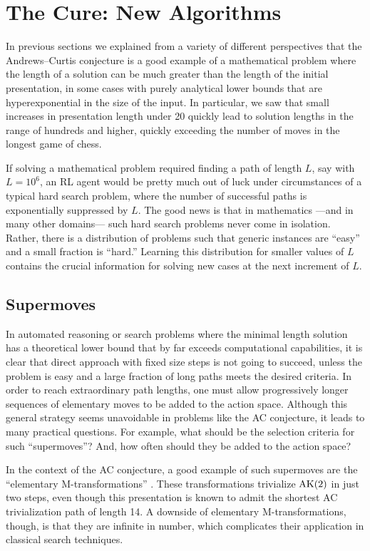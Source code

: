 \section{The Cure: New Algorithms}\label{sec:algo}

In previous sections we explained from a variety of different perspectives that the Andrews--Curtis conjecture is a good example of a mathematical problem where the length of a solution can be much greater than the length of the initial presentation, in some cases with purely analytical lower bounds that are hyperexponential in the size of the input. In particular, we saw that small increases in presentation length under 20 quickly lead to solution lengths in the range of hundreds and higher, quickly exceeding the number of moves in the longest game of chess.

If solving a mathematical problem required finding a path of length $L$, say with $L=10^6$, an RL agent would be pretty much out of luck under circumstances of a typical hard search problem, where the number of successful paths is exponentially suppressed by $L$. The good news is that in mathematics ---and in many other domains--- such hard search problems never come in isolation. Rather, there is a distribution of problems such that generic instances are ``easy'' and a small fraction is ``hard.'' Learning this distribution for smaller values of $L$ contains the crucial information for solving new cases at the next increment of $L$.

\subsection{Supermoves}

In automated reasoning or search problems where the minimal length solution has a theoretical lower bound that by far exceeds computational capabilities, it is clear that direct approach with fixed size steps is not going to succeed, unless the problem is easy and a large fraction of long paths meets the desired criteria. In order to reach extraordinary path lengths, one must allow progressively longer sequences of elementary moves to be added to the action space. Although this general strategy seems unavoidable in problems like the AC conjecture, it leads to many practical questions. For example, what should be the selection criteria for such ``supermoves''? And, how often should they be added to the action space?

In the context of the AC conjecture, a good example of such supermoves are the ``elementary M-transformations'' \cite{BurnsI, BurnsII}. These transformations trivialize $\text{AK}(2)$ in just two steps, even though this presentation is known to admit the shortest AC trivialization path of length 14. A downside of elementary M-transformations, though, is that they are infinite in number, which complicates their application in classical search techniques.

